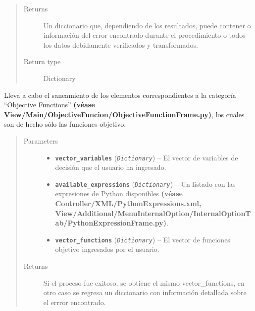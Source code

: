 \documentclass[letterpaper,10pt,english]{sphinxmanual}
\begin{document}
\begin{fulllineitems}
\begin{fulllineitems}
\begin{quote}
\begin{description}
\begin{itemize}
\end{itemize}

\item[{Returns}] \leavevmode
Un diccionario que, dependiendo de los resultados, puede contener
o información del error encontrado durante el procedimiento o 
todos los datos debidamente verificados y transformados.

\item[{Return type}] \leavevmode
Dictionary

\end{description}\end{quote}

\end{fulllineitems}


\begin{fulllineitems}
\label{Controller/Verifier:Controller.Verifier.Verifier.sanitize_objective_functions}
Lleva a cabo el saneamiento de los elementos correspondientes a la categoría
``Objective Functions'' \textbf{(véase View/Main/ObjectiveFuncion/ObjectiveFunctionFrame.py)}, 
los cuales son de hecho sólo las funciones objetivo.
\begin{quote}\begin{description}
\item[{Parameters}] \leavevmode\begin{itemize}
\item {} 
\textbf{\texttt{vector\_variables}} (\emph{\texttt{Dictionary}}) -- El vector de variables de decisión que el usuario
ha ingresado.

\item {} 
\textbf{\texttt{available\_expressions}} (\emph{\texttt{Dictionary}}) -- Un listado con las expresiones de Python
disponibles \textbf{(véase Controller/XML/PythonExpressions.xml,
View/Additional/MenuInternalOption/InternalOptionTab/PythonExpressionFrame.py)}.

\item {} 
\textbf{\texttt{vector\_functions}} (\emph{\texttt{Dictionary}}) -- El vector de funciones objetivo ingresados por el usuario.

\end{itemize}

\item[{Returns}] \leavevmode
Si el proceso fue exitoso, se obtiene el mismo vector\_functions,
en otro caso se regresa un diccionario con información detallada
sobre el errror encontrado.


\end{description}
\end{quote}
\end{fulllineitems}
\end{fulllineitems}
\end{document}
